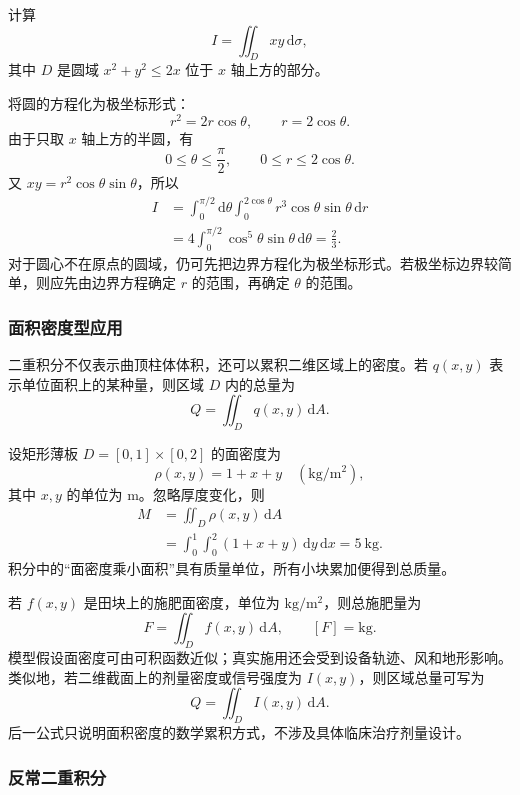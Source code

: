 \documentclass[fontset=fandol]{ctexart}
\newcommand{\dd}{\mathrm{d}}
\begin{document}
\begin{example}[偏心圆区域上的二重积分]
计算
\[
I=\iint_Dxy\,\dd\sigma,
\]
其中 $D$ 是圆域 $x^2+y^2\leq2x$ 位于 $x$ 轴上方的部分。

将圆的方程化为极坐标形式：
\[
r^2=2r\cos\theta,\qquad r=2\cos\theta.
\]
由于只取 $x$ 轴上方的半圆，有
\[
0\leq\theta\leq\frac\pi2,\qquad0\leq r\leq2\cos\theta.
\]
又 $xy=r^2\cos\theta\sin\theta$，所以
\[
\begin{aligned}
I&=\int_0^{\pi/2}\dd\theta\int_0^{2\cos\theta}
r^3\cos\theta\sin\theta\,\dd r\\
&=4\int_0^{\pi/2}\cos^5\theta\sin\theta\,\dd\theta
=\frac23.
\end{aligned}
\]
对于圆心不在原点的圆域，仍可先把边界方程化为极坐标形式。若极坐标边界较简单，则应先由边界方程确定 $r$ 的范围，再确定 $\theta$ 的范围。
\end{example}

\subsubsection*{面积密度型应用}

二重积分不仅表示曲顶柱体体积，还可以累积二维区域上的密度。若 $q(x,y)$ 表示单位面积上的某种量，则区域 $D$ 内的总量为
\[
Q=\iint_D q(x,y)\,\dd A.
\]

\begin{application}[工程：薄板总质量]
设矩形薄板 $D=[0,1]\times[0,2]$ 的面密度为
\[
\rho(x,y)=1+x+y\quad(\mathrm{kg/m^2}),
\]
其中 $x,y$ 的单位为 $\mathrm m$。忽略厚度变化，则
\[
\begin{aligned}
M&=\iint_D\rho(x,y)\,\dd A\\
&=\int_0^1\int_0^2(1+x+y)\,\dd y\,\dd x
=5\ \mathrm{kg}.
\end{aligned}
\]
积分中的“面密度乘小面积”具有质量单位，所有小块累加便得到总质量。
\end{application}

\begin{application}
若 $f(x,y)$ 是田块上的施肥面密度，单位为 $\mathrm{kg/m^2}$，则总施肥量为
\[
F=\iint_D f(x,y)\,\dd A,
\qquad [F]=\mathrm{kg}.
\]
模型假设面密度可由可积函数近似；真实施用还会受到设备轨迹、风和地形影响。类似地，若二维截面上的剂量密度或信号强度为 $I(x,y)$，则区域总量可写为
\[
Q=\iint_D I(x,y)\,\dd A.
\]
后一公式只说明面积密度的数学累积方式，不涉及具体临床治疗剂量设计。
\end{application}

\subsubsection*{反常二重积分}
\end{document}
